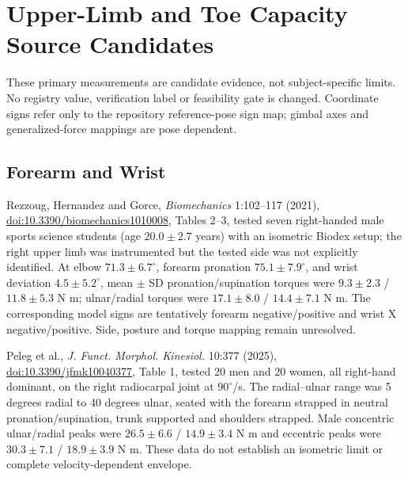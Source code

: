 \documentclass{article}
\begin{document}
\section{Upper-Limb and Toe Capacity Source Candidates}
These primary measurements are candidate evidence, not subject-specific
limits. No registry value, verification label or feasibility gate is changed.
Coordinate signs refer only to the repository reference-pose sign map; gimbal
axes and generalized-force mappings are pose dependent.

\subsection{Forearm and Wrist}
Rezzoug, Hernandez and Gorce, \emph{Biomechanics} 1:102--117 (2021),
\href{https://doi.org/10.3390/biomechanics1010008}{doi:10.3390/biomechanics1010008},
Tables 2--3, tested seven right-handed male sports science students (age
$20.0\pm2.7$ years) with an isometric Biodex setup; the right upper limb was
instrumented but the tested side was not explicitly identified. At elbow $71.3\pm6.7^\circ$, forearm
pronation $75.1\pm7.9^\circ$, and wrist deviation $4.5\pm5.2^\circ$, mean
$\pm$ SD pronation/supination torques were $9.3\pm2.3$ / $11.8\pm5.3$ N m;
ulnar/radial torques were $17.1\pm8.0$ / $14.4\pm7.1$ N m. The corresponding
model signs are tentatively forearm negative/positive and wrist X
negative/positive. Side, posture and torque mapping remain unresolved.

Peleg et al., \emph{J. Funct. Morphol. Kinesiol.} 10:377 (2025),
\href{https://doi.org/10.3390/jfmk10040377}{doi:10.3390/jfmk10040377},
Table 1, tested 20 men and 20 women, all right-hand dominant, on the right
radiocarpal joint at $90^\circ$/s. The radial--ulnar range was 5 degrees
radial to 40 degrees ulnar, seated with the forearm strapped in neutral
pronation/supination, trunk supported and shoulders strapped. Male concentric
ulnar/radial peaks were $26.5\pm6.6$ / $14.9\pm3.4$ N m and eccentric peaks
were $30.3\pm7.1$ / $18.9\pm3.9$ N m. These data do not establish an isometric
limit or complete velocity-dependent envelope.
\end{document}
